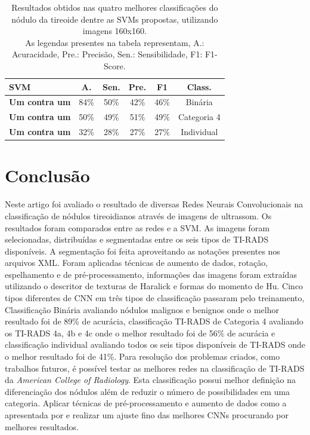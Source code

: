 \documentclass[12pt]{article}
\begin{document}
\begin{table}[h]
\centering
\caption{\textmd{Resultados obtidos nas quatro melhores classificações do nódulo da tireoide dentre as SVMs propostas, utilizando imagens 160x160.
\\As legendas presentes na tabela representam, A.: Acuracidade, Pre.: Precisão, Sen.: Sensibilidade, F1: F1-Score.
}\\}\label{table:binary}
\begin{tabular}{lccccc}
\toprule
 {SVM} & {A.} & {Sen.} & {Pre.} & {F1} & {Class.} \\
\midrule
\textbf{Um contra um} & 84\% & 50\% & 42\% & 46\% & Binária \\
\midrule
\textbf{Um contra um} & 50\% & 49\% & 51\% & 49\% & Categoria 4 \\
\midrule
\textbf{Um contra um} & 32\% & 28\% & 27\% & 27\% & Individual \\
\bottomrule
\end{tabular}
\label{tab:svm}
\end{table}

\section{Conclusão}
Neste artigo foi avaliado o resultado de diversas Redes Neurais Convolucionais na classificação de nódulos tireoidianos através de imagens de ultrassom. Os resultados foram comparados entre as redes e a SVM. As imagens foram selecionadas, distribuídas e segmentadas entre os seis tipos de TI-RADS disponíveis. A segmentação foi feita aproveitando as notações presentes nos arquivos XML. Foram aplicadas técnicas de aumento de dados, rotação, espelhamento e de pré-processamento, informações das imagens foram extraídas utilizando o descritor de texturas de Haralick e formas do momento de Hu. Cinco tipos diferentes de CNN em três tipos de classificação passaram pelo treinamento, Classificação Binária avaliando nódulos malignos e benignos onde o melhor resultado foi de 89\% de acurácia, classificação TI-RADS de Categoria 4 avaliando os TI-RADS 4a, 4b e 4c onde o melhor resultado foi de 56\% de acurácia e classificação individual avaliando todos os seis tipos disponíveis de TI-RADS onde o melhor resultado foi de 41\%. Para resolução dos problemas criados, como trabalhos futuros, é possível testar as melhores redes na classificação de TI-RADS da \textit{American College of Radiology}. Esta classificação possui melhor definição na diferenciação dos nódulos além de reduzir o número de possibilidades em uma categoria. Aplicar técnicas de pré-processamento e aumento de dados como a apresentada por \cite{ChiJ} e realizar um ajuste fino das melhores CNNs procurando por melhores resultados.



\end{document}
